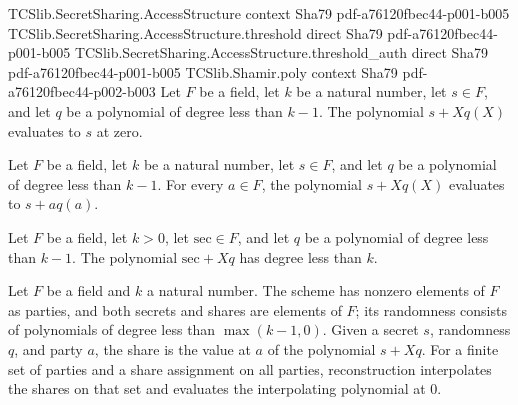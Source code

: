\begin{theorem}
\label{TCSlib.Shamir.poly_eval_zero}
\leanok
\proofstep
  {TCSlib.SecretSharing.AccessStructure}
  {context}
  {Sha79}
  {pdf-a76120fbec44-p001-b005}
\proofstep
  {TCSlib.SecretSharing.AccessStructure.threshold}
  {direct}
  {Sha79}
  {pdf-a76120fbec44-p001-b005}
\proofstep
  {TCSlib.SecretSharing.AccessStructure.threshold_auth}
  {direct}
  {Sha79}
  {pdf-a76120fbec44-p001-b005}
\proofstep
  {TCSlib.Shamir.poly}
  {context}
  {Sha79}
  {pdf-a76120fbec44-p002-b003}
Let $F$ be a field, let $k$ be a natural number, let $s\in F$, and let $q$ be a
polynomial of degree less than $k-1$. The polynomial $s+Xq(X)$ evaluates to $s$ at zero.
\end{theorem}

\begin{theorem}
\label{TCSlib.Shamir.poly_eval}
\leanok
{}
Let $F$ be a field, let $k$ be a natural number, let $s\in F$, and let $q$ be a
polynomial of degree less than $k-1$. For every $a\in F$, the polynomial $s+Xq(X)$
evaluates to $s+a q(a)$.
\end{theorem}

\begin{theorem}
\label{TCSlib.Shamir.degree_poly_lt}
\leanok
{}
Let $F$ be a field, let $k>0$, let $\mathrm{sec}\in F$, and let $q$ be a polynomial of
degree less than $k-1$. The polynomial $\mathrm{sec}+Xq$ has degree less than $k$.
\end{theorem}

\begin{definition}
\label{TCSlib.Shamir.scheme}
\leanok
{}
Let $F$ be a field and $k$ a natural number. The scheme has nonzero elements of $F$ as
parties, and both secrets and shares are elements of $F$; its randomness consists of
polynomials of degree less than $\max(k-1,0)$. Given a secret $s$, randomness $q$, and
party $a$, the share is the value at $a$ of the polynomial $s+Xq$. For a finite set of
parties and a share assignment on all parties, reconstruction interpolates the shares on
that set and evaluates the interpolating polynomial at $0$.
\end{definition}

